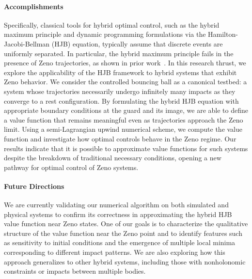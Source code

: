 \documentclass[letterpaper,11pt]{article}
\begin{document}
\paragraph{Accomplishments}

Specifically, classical tools for hybrid optimal control, such as the hybrid maximum principle and dynamic programming formulations via the Hamilton-Jacobi-Bellman (HJB) equation, typically assume that discrete events are uniformly separated. 
In particular, the hybrid maximum principle fails in the presence of Zeno trajectories, as shown in prior work~\cite{clark2023optimality}.
In this research thrust, we explore the applicability of the HJB framework to hybrid systems that exhibit Zeno behavior.
We consider the controlled bouncing ball as a canonical testbed: a system whose trajectories necessarily undergo infinitely many impacts as they converge to a rest configuration. 
By formulating the hybrid HJB equation with appropriate boundary conditions at the guard and its image, we are able to define a value function that remains meaningful even as trajectories approach the Zeno limit. 
Using a semi-Lagrangian upwind numerical scheme, we compute the value function and investigate how optimal controls behave in the Zeno regime. 
Our results indicate that it is possible to approximate value functions for such systems despite the breakdown of traditional necessary conditions, opening a new pathway for optimal control of Zeno systems.

\paragraph{Future Directions}

We are currently validating our numerical algorithm on both simulated and physical systems to confirm its correctness in approximating the hybrid HJB value function near Zeno states. 
One of our goals is to characterize the qualitative structure of the value function near the Zeno point and to identify features such as sensitivity to initial conditions and the emergence of multiple local minima corresponding to different impact patterns.
We are also exploring how this approach generalizes to other hybrid systems, including those with nonholonomic constraints or impacts between multiple bodies.


\end{document}

